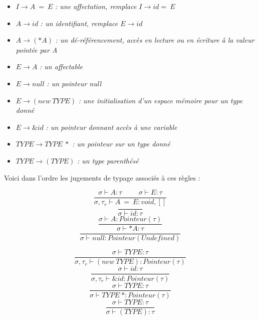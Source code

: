 \documentclass{article}
\begin{document}
\begin{itemize}[label=\textbullet, font=\LARGE \color{black},leftmargin=1cm]
    \setlength\itemsep{-0.2em}
    \item $I \xrightarrow{} A\ =\ E$ \textit{: une affectation, remplace $I \xrightarrow{} id =\ E$}
    \item $A \xrightarrow{} id$ \textit{: un identifiant, remplace $E \xrightarrow{} id$}
    \item $A \xrightarrow{} (*A)$ \textit{: un dé-référencement, accès en lecture ou en écriture à la valeur pointée par A}
    \item $E \xrightarrow{} A$ \textit{: un affectable}
    \item $E \xrightarrow{} null$ \textit{: un pointeur null}
    \item $E \xrightarrow{} (new\ TYPE)$ \textit{: une initialisation d'un espace mémoire pour un type donné}
    \item $E \xrightarrow{} \&id$ \textit{: un pointeur donnant accès à une variable}
    \item $TYPE \xrightarrow{} TYPE\ *$ \textit{: un pointeur sur un type donné}
    \item $TYPE \xrightarrow{} (TYPE)$ \textit{: un type parenthésé}
\end{itemize}
\hbox{}
Voici dans l'ordre les jugements de typage associés à ces règles :

\begin{minipage}{0.45\textwidth}
\begin{equation}
\frac {\sigma \vdash A:\tau \hspace{1cm} \sigma \vdash E : \tau}
{\sigma, \tau_r \vdash A\ =\ E:void,[]}
\end{equation}
\begin{equation}
\frac {\ }
{\sigma\vdash id:\tau}
\end{equation}
\begin{equation}
\frac {\sigma\vdash A:Pointeur(\tau)}
{\sigma\vdash *A:\tau}
\end{equation}
\begin{equation}
\frac {\ }
{\sigma\vdash null:Pointeur(Undefined)}
\end{equation}
\end{minipage}%
\hfill
\begin{minipage}{0.45\textwidth}
\begin{equation}
\frac {\sigma\vdash TYPE:\tau}
{\sigma,\tau_r\vdash (new\ TYPE):Pointeur(\tau)}
\end{equation}
\begin{equation}
\frac {\sigma\vdash id:\tau}
{\sigma,\tau_r\vdash \&id:Pointeur(\tau)}
\end{equation}
\begin{equation}
\frac {\sigma\vdash TYPE:\tau}
{\sigma\vdash TYPE\ *:Pointeur(\tau)}
\end{equation}
\begin{equation}
\frac {\sigma\vdash TYPE:\tau}
{\sigma\vdash (TYPE):\tau}
\end{equation}
\end{minipage}%
\end{document}
